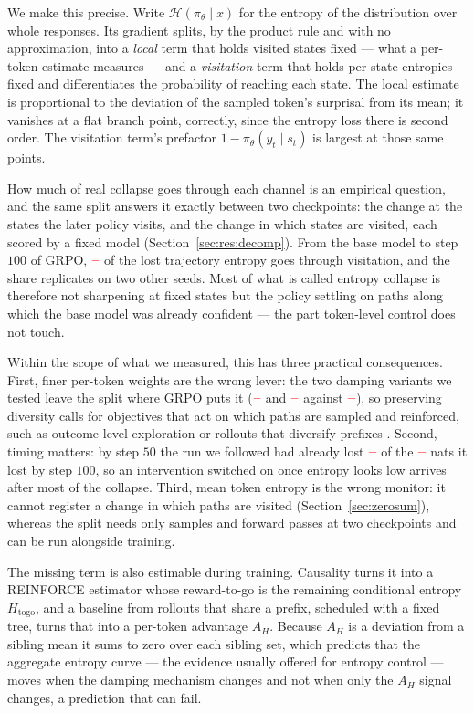 \documentclass[11pt]{article}
\newcommand{\Htraj}{\mathcal{H}}
\newcommand{\Htogo}{H_{\mathrm{togo}}}
\newcommand{\AH}{A_{H}}
\newcommand{\pit}{\pi_{\theta}}
\providecommand{\PENDING}{\textcolor{red}{\textbf{--}}}
\newcommand{\num}[1]{\ifcsname #1\endcsname\csname #1\endcsname\else\PENDING\fi}
\begin{document}
We make this precise. Write $\Htraj(\pit \mid x)$ for the entropy of the distribution
over whole responses. Its gradient splits, by the product rule and with no
approximation, into a \emph{local} term that holds visited states fixed --- what a
per-token estimate measures --- and a \emph{visitation} term that holds per-state
entropies fixed and differentiates the probability of reaching each state. The local
estimate is proportional to the deviation of the sampled token's surprisal from its
mean; it vanishes at a flat branch point, correctly, since the entropy loss there is
second order. The visitation term's prefactor $1 - \pit(y_t \mid s_t)$ is largest at
those same points.

How much of real collapse goes through each channel is an empirical question, and
the same split answers it exactly between two checkpoints: the change at the states
the later policy visits, and the change in which states are visited, each scored by a
fixed model (Section~\ref{sec:res:decomp}). From the base model to step $100$ of GRPO,
$\num{DecGrpoShare}$ of the lost trajectory entropy goes through visitation, and the
share replicates on two other seeds. Most of
what is called entropy collapse is therefore not sharpening at fixed states but the
policy settling on paths along which the base model was already confident --- the part
token-level control does not touch.

Within the scope of what we measured, this has three practical consequences. First,
finer per-token weights are the wrong lever: the two damping variants we tested leave
the split where GRPO puts it ($\num{DecPermShare}$ and $\num{DecSignedShare}$ against
$\num{DecGrpoShare}$), so preserving diversity calls for objectives that act on which
paths are sampled and reinforced, such as outcome-level exploration
\citep{song2025outcome} or rollouts that diversify prefixes \citep{cao2026treeadv}.
Second, timing matters: by step $50$ the run we followed had already lost
$\num{DecSecSignedADH}$ of the $\num{DecSignedDH}$ nats it lost by step $100$, so an
intervention switched on once entropy looks low arrives after most of the collapse.
Third, mean token entropy is the wrong monitor: it cannot register a change in which
paths are visited (Section~\ref{sec:zerosum}), whereas the split needs only samples
and forward passes at two checkpoints and can be run alongside training.

The missing term is also estimable during training. Causality turns it into a
REINFORCE estimator whose reward-to-go is the remaining conditional entropy $\Htogo$,
and a baseline from rollouts that share a prefix, scheduled with a fixed tree, turns
that into a per-token advantage $\AH$. Because $\AH$ is a deviation from a sibling
mean it sums to zero over each sibling set, which predicts that the aggregate entropy
curve --- the evidence usually offered for entropy control --- moves when the damping
mechanism changes and not when only the $\AH$ signal changes, a prediction that can
fail.
\end{document}
